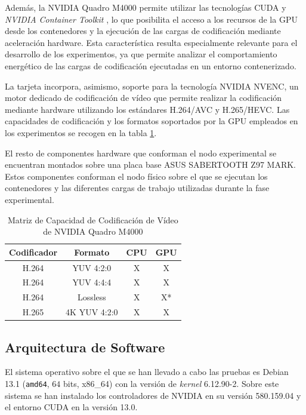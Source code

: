  Además, la NVIDIA Quadro M4000 permite utilizar las tecnologías CUDA y \textit{NVIDIA Container Toolkit} \cite{nvidia-container-toolkit}, lo que posibilita el acceso a los recursos de la GPU desde los contenedores y la ejecución de las cargas de codificación mediante aceleración hardware. Esta característica resulta especialmente relevante para el desarrollo de los experimentos, ya que permite analizar el comportamiento energético de las cargas de codificación ejecutadas en un entorno contenerizado.
 
 La tarjeta incorpora, asimismo, soporte para la tecnología NVIDIA NVENC, un motor dedicado de codificación de vídeo que permite realizar la codificación mediante hardware utilizando los estándares H.264/AVC y H.265/HEVC. Las capacidades de codificación y los formatos soportados por la GPU empleados en los experimentos se recogen en la tabla \ref{tab:nvidia-matrix-capacity}.
 
 El resto de componentes hardware que conforman el nodo experimental se encuentran montados sobre una placa base ASUS SABERTOOTH Z97 MARK. Estos componentes conforman el nodo físico sobre el que se ejecutan los contenedores y las diferentes cargas de trabajo utilizadas durante la fase experimental. 

 \begin{table}[H]
  \center
  \begin{tabular}{cccc}
  \hline
  \textbf{Codificador} & \textbf{Formato} & \textbf{CPU} & \textbf{GPU} \\ \hline
  H.264                & YUV 4:2:0        & X            & X            \\
  H.264                & YUV 4:4:4        & X            & X            \\
  H.264                & Lossless         & X            & X*           \\
  H.265                & 4K YUV 4:2:0     & X            & X            \\ \hline
  \end{tabular}
  
  \caption{Matriz de Capacidad de Codificación de Vídeo de NVIDIA Quadro M4000}
  \label{tab:nvidia-matrix-capacity}
 \end{table}

 \subsection{Arquitectura de Software}
  El sistema operativo sobre el que se han llevado a cabo las pruebas es Debian 13.1 (\texttt{amd64}, $64$ bits, x86\_64) con la versión de \textit{kernel} 6.12.90-2. Sobre este sistema se han instalado los controladores de NVIDIA en su versión 580.159.04 y el entorno CUDA en la versión 13.0.
  
